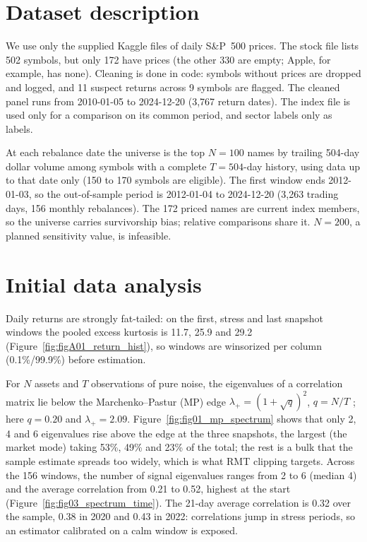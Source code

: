 \documentclass[11pt,a4paper]{article}
\begin{document}
\section{Dataset description}

We use only the supplied Kaggle files of daily S\&P~500 prices. The stock file lists 502 symbols, but only
172 have prices (the other 330 are empty; Apple, for example, has none). Cleaning is done in code: symbols
without prices are dropped and logged, and 11 suspect returns across 9 symbols are flagged. The cleaned panel
runs from 2010-01-05 to 2024-12-20 (3{,}767 return dates). The index file is used only for a comparison on its
common period, and sector labels only as labels.

At each rebalance date the universe is the top $N=100$ names by trailing 504-day dollar volume among symbols
with a complete $T=504$-day history, using data up to that date only (150 to 170 symbols are eligible).
The first window ends 2012-01-03, so the out-of-sample period is 2012-01-04 to 2024-12-20 (3{,}263 trading
days, 156 monthly rebalances). The 172 priced names are current index members, so the universe carries
survivorship bias; relative comparisons share it. $N=200$, a planned sensitivity value, is infeasible.

\section{Initial data analysis}

Daily returns are strongly fat-tailed: on the first, stress and last snapshot windows the pooled excess
kurtosis is 11.7, 25.9 and 29.2 (Figure~\ref{fig:figA01_return_hist}), so windows are winsorized per column
(0.1\%/99.9\%) before estimation.

For $N$ assets and $T$ observations of pure noise, the eigenvalues of a correlation matrix lie below the
Marchenko--Pastur (MP) edge $\lambda_+=(1+\sqrt{q})^2$, $q=N/T$ \cite{mp1967}; here $q=0.20$ and
$\lambda_+=2.09$. Figure~\ref{fig:fig01_mp_spectrum} shows that only 2, 4 and 6 eigenvalues rise above the
edge at the three snapshots, the largest (the market mode) taking 53\%, 49\% and 23\% of the total; the rest
is a bulk that the sample estimate spreads too widely, which is what RMT clipping targets. Across the 156
windows, the number of signal eigenvalues ranges from 2 to 6 (median 4) and the average correlation from
0.21 to 0.52, highest at the start (Figure~\ref{fig:fig03_spectrum_time}). The 21-day average correlation
is 0.32 over the sample, 0.38 in 2020 and 0.43 in 2022: correlations jump in stress periods, so an estimator
calibrated on a calm window is exposed.
\end{document}
